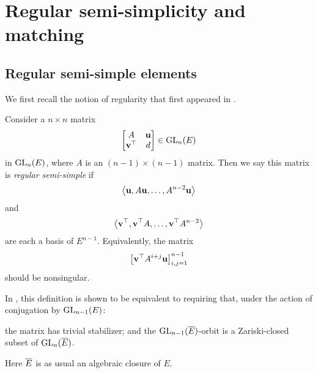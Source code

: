\chapter{Regular semi-simplicity and matching}
\label{ch:matching}

\section{Regular semi-simple elements}
We first recall the notion of regularity
that first appeared in \cite[\S6]{ref:multoneconj}.

\begin{definition}
  Consider a $n \times n$ matrix
  \[ \begin{bmatrix} A & \mathbf u \\ \mathbf v^\top & d \end{bmatrix} \in \operatorname{GL}_n(E) \]
  in $\operatorname{GL}_n(E)$, where $A$ is an $(n-1) \times (n-1)$ matrix.
  Then we say this matrix is \emph{regular semi-simple} if
  \[ \left< \mathbf u, A\mathbf u, \dots, A^{n-2}\mathbf u \right> \]
  and \[ \left< \mathbf v^\top, \mathbf v^\top A, \dots, \mathbf v^\top A^{n-2} \right> \]
  are each a basis of $E^{n-1}$.
  Equivalently, the matrix
  \[ \left[ \mathbf v^\top A^{i+j} \mathbf u \right]_{i,j=1}^{n-1} \]
  should be nonsingular.
\end{definition}

\begin{remark}
  In \cite[Theorem 6.1]{ref:multoneconj}, this definition is shown to be equivalent to
  requiring that, under the action of conjugation by $\operatorname{GL}_{n-1}(E)$:
  \begin{itemize}
  \ii the matrix has trivial stabilizer; and
  \ii the $\operatorname{GL}_{n-1}(\overline E)$-orbit is a Zariski-closed subset of $\operatorname{GL}_n(\overline E)$.
  \end{itemize}
  Here $\overline E$ is as usual an algebraic closure of $E$.
\end{remark}

